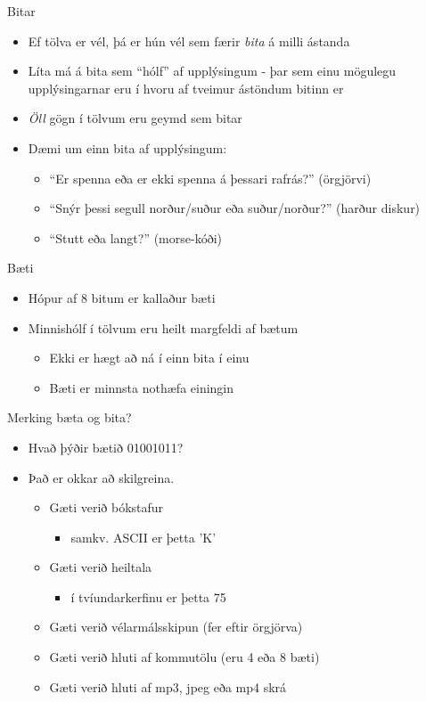 \documentclass[handout]{beamer}
\begin{document}
\begin{frame}{Bitar}
\begin{itemize} 
 \item Ef tölva er vél, þá er hún vél sem færir \emph{bita} á milli ástanda
 \item Líta má á bita sem ``hólf'' af upplýsingum - þar sem einu mögulegu upplýsingarnar eru í hvoru af tveimur ástöndum bitinn er
 \item \emph{Öll} gögn í tölvum eru geymd sem bitar
 \item Dæmi um einn bita af upplýsingum:
 \begin{itemize}
  \item ``Er spenna eða er ekki spenna á þessari rafrás?'' (örgjörvi)
  \item ``Snýr þessi segull norður/suður eða suður/norður?'' (harður diskur)
  \item ``Stutt eða langt?'' (morse-kóði)
 \end{itemize}
\end{itemize}
\end{frame}

\begin{frame}{Bæti}
\begin{itemize}
 \item Hópur af 8 bitum er kallaður bæti
 \item Minnishólf í tölvum eru heilt margfeldi af bætum
 \begin{itemize}
  \item Ekki er hægt að ná í einn bita í einu
  \item Bæti er minnsta nothæfa einingin
 \end{itemize}
\end{itemize}
\end{frame}

\begin{frame}{Merking bæta og bita?}

\begin{itemize}
 \item Hvað þýðir bætið 01001011? \pause
 \item Það er okkar að skilgreina.
 \begin{itemize}
  \item Gæti verið bókstafur
  \begin{itemize}
   \item samkv. ASCII er þetta 'K'
  \end{itemize}
   \item Gæti verið heiltala
  \begin{itemize}
   \item í tvíundarkerfinu er þetta 75
  \end{itemize}
  \item Gæti verið vélarmálsskipun (fer eftir örgjörva)
  \item Gæti verið hluti af kommutölu (eru 4 eða 8 bæti)
  \item Gæti verið hluti af mp3, jpeg eða mp4 skrá
 \end{itemize}
\end{itemize}
\end{frame}
\end{document}
